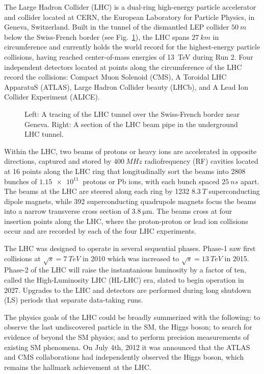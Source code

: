 The Large Hadron Collider (LHC) \cite{LHCTDR} is a dual-ring high-energy particle accelerator and collider located at CERN, the European Laboratory for Particle Physics, in Geneva, Switzerland. Built in the tunnel of the dismantled LEP collider $\SI{50}{m}$ below the Swiss-French border (see Fig.~\ref{fig:LHC}), the LHC spans $\SI{27}{km}$ in circumference and currently holds the world record for the highest-energy particle collisions, having reached center-of-mass energies of \SI{13}{TeV} during Run 2. Four independent detectors located at points along the circumference of the LHC record the collisions: Compact Muon Solenoid (CMS), A Toroidal LHC ApparatuS (ATLAS), Large Hadron Collider beauty (LHCb), and A Lead Ion Collider Experiment (ALICE).

\begin{figure}[H]
    \centering
    \caption{Left: A tracing of the LHC tunnel over the Swiss-French border near Geneva. Right: A section of the LHC beam pipe in the underground LHC tunnel.}
    \label{fig:LHC}
\end{figure}

Within the LHC, two beams of protons or heavy ions are accelerated in opposite directions, captured and stored by $\SI{400}{MHz}$ radiofrequency (RF) cavities located at 16 points along the LHC ring that longitudinally sort the beams into 2808 bunches of $\SI{1.15e11}{}$ protons or Pb ions, with each bunch spaced $\SI{25}{ns}$ apart. The beams at the LHC are steered along each ring by 1232 $\SI{8.3}{T}$ superconducting dipole magnets, while 392 superconducting quadrupole magnets focus the beams into a narrow transverse cross section of $\SI{3.8}{\micro\meter}$. The beams cross at four insertion points along the LHC, where the proton-proton or lead ion collisions occur and are recorded by each of the four LHC experiments.

The LHC was designed to operate in several sequential phases. Phase-1 saw first collisions at $\sqrt{s}=\SI{7}{TeV}$ in 2010 which was increased to $\sqrt{s}=\SI{13}{TeV}$ in 2015. Phase-2 of the LHC will raise the instantanious luminosity by a factor of ten, called the High-Luminosity LHC (HL-LHC) era, slated to begin operation in 2027. Upgrades to the LHC and detectors are performed during long shutdown (LS) periods that separate data-taking runs.

The physics goals of the LHC could be broadly summerized with the following: to observe the last undiscovered particle in the SM, the Higgs boson; to search for evidence of beyond the SM physics; and to perform precision measurements of existing SM phenomena. On July 4th, 2012 it was announced that the ATLAS and CMS collaborations had independently observed the Higgs boson, which remains the hallmark achievement at the LHC.